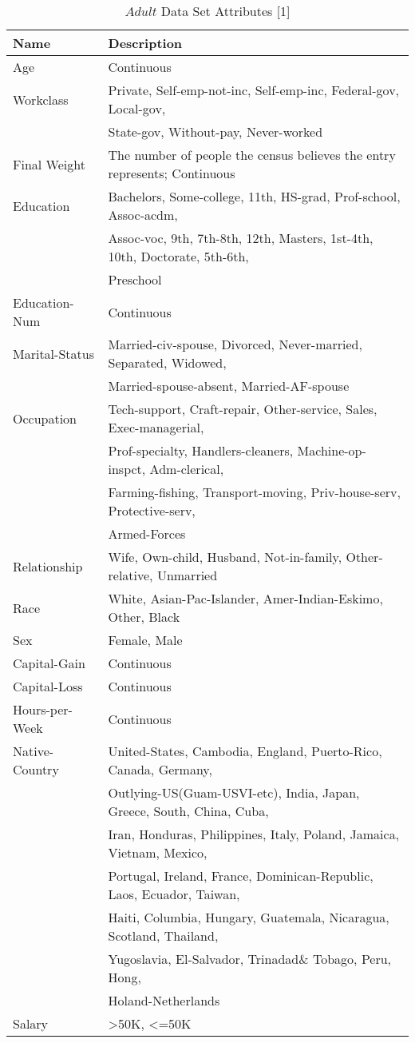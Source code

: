 \documentclass{article}
\begin{document}
\begin{table}
  \caption{$Adult$ Data Set Attributes [1]}
  \label{attributes}
  \centering
  \begin{tabular}{ll}
    \toprule
    Name     & Description\\
    \midrule
    Age & Continuous\\
    Workclass & Private, Self-emp-not-inc, Self-emp-inc, Federal-gov, Local-gov,\\ &State-gov, Without-pay, Never-worked\\
    Final Weight & The number of people the census believes the entry represents; Continuous\\
    Education & Bachelors, Some-college, 11th, HS-grad, Prof-school, Assoc-acdm, \\&Assoc-voc, 9th, 7th-8th, 12th, Masters, 1st-4th, 10th, Doctorate, 5th-6th, \\&Preschool\\
    Education-Num & Continuous\\
    Marital-Status & Married-civ-spouse, Divorced, Never-married, Separated, Widowed, \\&Married-spouse-absent, Married-AF-spouse\\
    Occupation & Tech-support, Craft-repair, Other-service, Sales, Exec-managerial, \\&Prof-specialty, Handlers-cleaners, Machine-op-inspct, Adm-clerical, \\&Farming-fishing, Transport-moving, Priv-house-serv, Protective-serv, \\&Armed-Forces\\
    Relationship & Wife, Own-child, Husband, Not-in-family, Other-relative, Unmarried\\
    Race & White, Asian-Pac-Islander, Amer-Indian-Eskimo, Other, Black\\
    Sex & Female, Male\\
    Capital-Gain & Continuous\\
    Capital-Loss & Continuous\\
    Hours-per-Week & Continuous\\
    Native-Country & United-States, Cambodia, England, Puerto-Rico, Canada, Germany, \\&Outlying-US(Guam-USVI-etc), India, Japan, Greece, South, China, Cuba, \\&Iran, Honduras, Philippines, Italy, Poland, Jamaica, Vietnam, Mexico, \\&Portugal, Ireland, France, Dominican-Republic, Laos, Ecuador, Taiwan, \\&Haiti, Columbia, Hungary, Guatemala, Nicaragua, Scotland, Thailand, \\&Yugoslavia, El-Salvador, Trinadad\& Tobago, Peru, Hong, \\&Holand-Netherlands\\
    Salary & >50K, <=50K\\
    \bottomrule
  \end{tabular}
\end{table}
\end{document}
